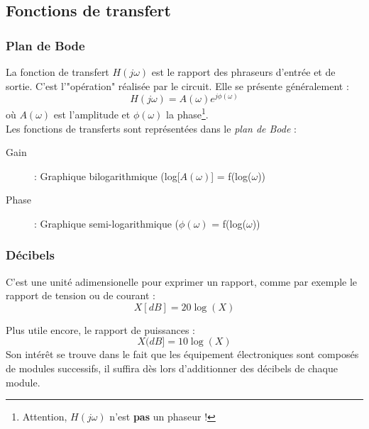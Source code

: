 \subsection{Fonctions de transfert}
\subsubsection{Plan de Bode}
La fonction de transfert $H(j\omega)$ est le rapport des phraseurs d'entrée et de sortie. C'est l'"opération" réalisée par le circuit. Elle se présente généralement :
\begin{equation}
H(j\omega) = A(\omega)e^{j\phi(\omega)}
\end{equation}
où $A(\omega)$ est l'amplitude et $\phi(\omega)$ la phase\footnote{Attention, $H(j\omega)$ n'est \textbf{pas} un phaseur !}.\\

Les fonctions de transferts sont représentées dans le \textit{plan de Bode} :
\begin{description}
\item[Gain] : Graphique bilogarithmique (log[$A(\omega)$] = f(log($\omega$))
\item[Phase]: Graphique semi-logarithmique ($\phi(\omega)$ = f(log($\omega$))
\end{description}

\subsubsection{Décibels}
C'est une unité adimensionelle pour exprimer un rapport, comme par exemple le rapport de tension ou de courant :
\begin{equation}
X[dB] = 20\log(X)
\end{equation}

Plus utile encore, le rapport de puissances :
\begin{equation}
X(dB] = 10\log(X)
\end{equation}
Son intérêt se trouve dans le fait que les équipement électroniques sont composés de modules successifs, il suffira dès lors d'additionner des décibels de chaque module.